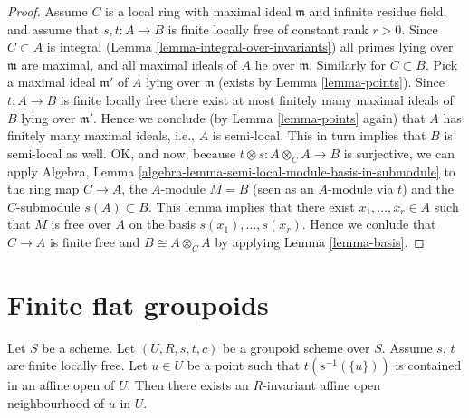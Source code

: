 \begin{proof}
\medskip\noindent
Assume $C$ is a local ring with maximal ideal $\mathfrak m$ and
infinite residue field, and assume that $s, t : A \to B$ is
finite locally free of constant rank $r > 0$.
Since $C \subset A$ is integral (Lemma \ref{lemma-integral-over-invariants})
all primes lying over $\mathfrak m$ are maximal, and all maximal
ideals of $A$ lie over $\mathfrak m$. Similarly for $C \subset B$.
Pick a maximal ideal $\mathfrak m'$
of $A$ lying over $\mathfrak m$ (exists by Lemma \ref{lemma-points}). 
Since $t : A \to B$ is finite locally free there exist at most finitely
many maximal ideals of $B$ lying over $\mathfrak m'$. Hence we conclude
(by Lemma \ref{lemma-points} again)
that $A$ has finitely many maximal ideals, i.e.,
$A$ is semi-local. This in turn implies that $B$ is semi-local as
well. OK, and now, because $t \otimes s : A \otimes_C A \to B$ is surjective,
we can apply
Algebra, Lemma \ref{algebra-lemma-semi-local-module-basis-in-submodule}
to the ring map $C \to A$, the $A$-module $M = B$ (seen as an $A$-module
via $t$) and the $C$-submodule $s(A) \subset B$. This lemma implies that there
exist $x_1, \ldots, x_r \in A$ such that $M$ is free over $A$
on the basis $s(x_1), \ldots, s(x_r)$. Hence we conlude that $C \to A$
is finite free and $B \cong A \otimes_C A$ by applying
Lemma \ref{lemma-basis}.
\end{proof}



\section{Finite flat groupoids}
\label{section-finite-flat-general}

\begin{lemma}
\label{lemma-find-invariant-affine}
Let $S$ be a scheme.
Let $(U, R, s, t, c)$ be a groupoid scheme over $S$.
Assume $s$, $t$ are finite locally free.
Let $u \in U$ be a point such that $t(s^{-1}(\{u\}))$
is contained in an affine open of $U$.
Then there exists an $R$-invariant affine open neighbourhood
of $u$ in $U$.
\end{lemma}

